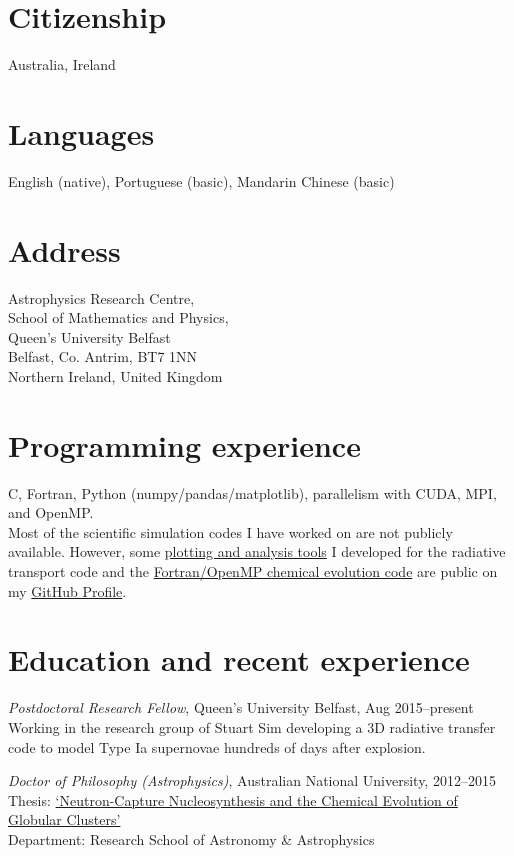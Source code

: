 \documentclass[11pt]{res} %
\begin{document}
\begin{resume}
\section{Citizenship}
  Australia, Ireland

\section{Languages}
  English (native), Portuguese (basic), Mandarin Chinese (basic)

\section{Address}
  Astrophysics Research Centre,\\
  School of Mathematics and Physics,\\
  Queen's University Belfast\\
  Belfast, Co. Antrim, BT7 1NN\\
  Northern Ireland, United Kingdom

\section{Programming experience}
  C, Fortran, Python (numpy/pandas/matplotlib), parallelism with CUDA, MPI, and OpenMP.\\
  Most of the scientific simulation codes I have worked on are not publicly available. However, some \href{https://github.com/lukeshingles/artistools}{plotting and analysis tools} I developed for the radiative transport code and the \href{https://github.com/lukeshingles/evelchemevol}{Fortran/OpenMP chemical evolution code} are public on my \href{https://github.com/lukeshingles}{GitHub Profile}.

\section{Education and recent experience}
  {\it Postdoctoral Research Fellow}, Queen's University Belfast, Aug 2015--present\\
  Working in the research group of Stuart Sim developing a 3D radiative transfer code to model Type Ia supernovae hundreds of days after explosion.

  {\it Doctor of Philosophy (Astrophysics)}, Australian National University, 2012--2015\\
  Thesis: \href{https://openresearch-repository.anu.edu.au/handle/1885/16507}{`Neutron-Capture Nucleosynthesis and the Chemical Evolution of Globular Clusters'}\\
  Department: Research School of Astronomy \& Astrophysics


\end{resume}
\end{document}
